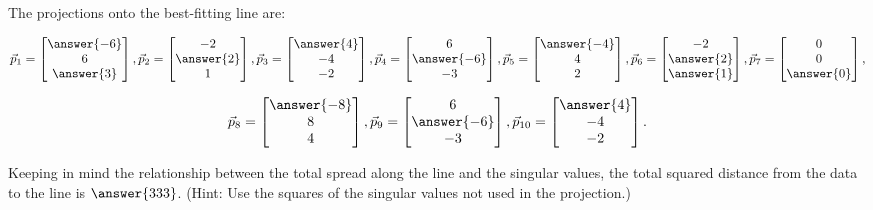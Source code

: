 \documentclass{ximera}
\begin{document}
\begin{problem}
  The projections onto the best-fitting line are:

$$\vec{p}_1=\begin{bmatrix}
    \answer{-6}\\6\\\answer{3}
  \end{bmatrix},\vec{p}_2=\begin{bmatrix}
    -2\\\answer{2}\\1
  \end{bmatrix},\vec{p}_3=\begin{bmatrix}
    \answer{4}\\-4\\-2
  \end{bmatrix},\vec{p}_4=\begin{bmatrix}
    6\\\answer{-6}\\-3
  \end{bmatrix},\vec{p}_5=\begin{bmatrix}
    \answer{-4}\\4\\2
  \end{bmatrix},\vec{p}_6=\begin{bmatrix}
    -2\\\answer{2}\\\answer{1}
  \end{bmatrix},\vec{p}_7=\begin{bmatrix}
    0\\0\\\answer{0}
  \end{bmatrix},$$
  
  $$\vec{p}_8=\begin{bmatrix}
    \answer{-8}\\8\\4
  \end{bmatrix},\vec{p}_9=\begin{bmatrix}
    6\\\answer{-6}\\-3
  \end{bmatrix},\vec{p}_{10}=\begin{bmatrix}
    \answer{4}\\-4\\-2
  \end{bmatrix}.$$

  Keeping in mind the relationship between the total spread along the line and the singular values, the total squared distance from the data to the line is $\answer{333}$. (Hint: Use the squares of the singular values not used in the projection.)


\end{problem}
\end{document}
